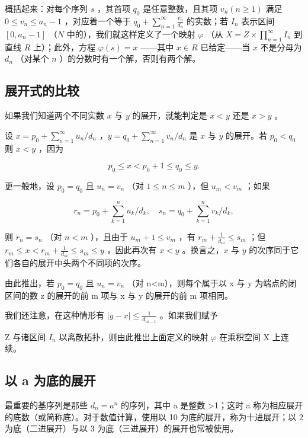 概括起来：对每个序列 \(s\) ，其首项 \(q_{0}\) 是任意整数，且其项 \(v_{n}(n \geqslant 1)\) 满足 \(0 \leqslant v_{n} \leqslant a_{n} - 1\) ，对应着一个等于 \(q_{0} + \sum_{n=1}^{\infty} \frac{v_{n}}{d_{n}}\) 的实数；若 \(I_{n}\) 表示区间 \([0, a_{n} - 1]\) （\(N\) 中的），我们就这样定义了一个映射 \(\varphi\) （从 \(X = Z \times \prod_{n=1}^{\infty} I_{n}\) 到直线 \(R\) 上）；此外，方程 \(\varphi(s) = x\) ——其中 \(x \in R\) 已给定——当 \(x\) 不是分母为 \(d_{n}\) （对某个 \(n\) ）的分数时有一个解，否则有两个解。

\subsection{展开式的比较}

如果我们知道两个不同实数 \(x\) 与 \(y\) 的展开，就能判定是 \(x < y\) 还是 \(x > y\) 。

设 \(x = p_0 + \sum_{n=1}^{\infty} u_n / d_n\) ，\(y = q_0 + \sum_{n=1}^{\infty} v_n / d_n\) 是 \(x\) 与 \(y\) 的展开。若 \(p_0 < q_0\) 则 \(x < y\) ，因为

\[
p _ {0} \leqslant x <   p _ {0} + 1 \leqslant q _ {0} \leqslant y.
\]

更一般地，设 \(p_0 = q_0\) 且 \(u_n = v_n\) （对 \(1 \leqslant n \leqslant m\) ），但 \(u_m < v_m\) ；如果

\[
r _ {n} = p _ {0} + \sum_ {k = 1} ^ {n} u _ {k} / d _ {k}, \quad s _ {n} = q _ {0} + \sum_ {k = 1} ^ {n} v _ {k} / d _ {k},
\]

则 \(r_n = s_n\) （对 \(n < m\) ），且由于 \(u_m + 1 \leqslant v_m\) ，有 \(r_m + \frac{1}{d_m} \leqslant s_m\) ；但 \(r_m \leqslant x < r_m + \frac{1}{d_m} \leqslant s_m \leqslant y\) ，因此再次有 \(x < y\) 。换言之，\(x\) 与 \(y\) 的次序同于它们各自的展开中头两个不同项的次序。

由此推出，若 \(p_{0}=q_{0}\) 且 \(u_{n}=v_{n}\) （对 n\textless m），则每个属于以 x 与 y 为端点的闭区间的数 z 的展开的前 m 项与 x 与 y 的展开的前 m 项相同。

我们还注意，在这种情形有 \(|y - x| \leqslant \frac{1}{d_{m-1}}\) 。如果我们赋予

Z 与诸区间 \(I_{n}\) 以离散拓扑，则由此推出上面定义的映射 \(\varphi\) 在乘积空间 X 上连续。

\subsection{以 a 为底的展开}

最重要的基序列是那些 \(d_{n}=a^{n}\) 的序列，其中 a 是整数 \textgreater1；这时 a 称为相应展开的底数（或简称底）。对于数值计算，使用以 10 为底的展开，称为十进展开；以 2 为底（二进展开）与以 3 为底（三进展开）的展开也常被使用。

